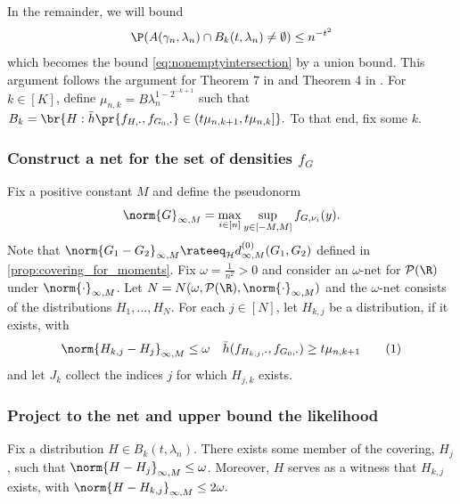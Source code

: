 \documentclass[12pt, reqno]{amsart}
\newcommand\numberthis{\addtocounter{equation}{1}\tag{\theequation}}
\newcommand{\fs}[1]{f_{#1, \boldsymbol{\cdot}}}
\newcommand{\barh}{\bar h}
\newcommand{\Hyperparams}{\mathcal{H}}
\numberwithin{equation}{section}
\begin{document}
\begin{refsection}
\begin{appendices}
In the remainder, we will bound \[
\P(A(\gamma_n, \lambda_n) \cap B_k(t, \lambda_n) \neq \emptyset) \le n^{-t^2}
\]
which becomes the bound \eqref{eq:nonemptyintersection} by a union bound. This argument
follows the argument for Theorem 7 in \citet{soloff2021multivariate} 
and Theorem 4 in \citet{jiang2020general}. For $k \in [K]$, define $\mu_{n,k} = B
\lambda_n^ {1-2^ {-k+1}}$ such that $B_k = \br{ H : \barh\pr{\fs{H}, \fs{G_0}} \in \left(t
\mu_{n,k+1}, t \mu_{n,k}\right] }.$ To that end, fix some $k$.

\subsubsection{Construct a net for the set of densities $f_G$}
Fix a positive constant $M$ and define the pseudonorm \[
\norm{G}_{\infty, M} = \max_{i\in [n]} \sup_{y \in [-M,M]} f_{G,\nu_i}(y).
\]
Note that $\norm{G_1-G_2}_{\infty, M} \rateeq_{\Hyperparams} d_{\infty, M}^{(0)}(G_1,
G_2)$
defined in
\cref{prop:covering_for_moments}. Fix $\omega = \frac{1}{n^2} > 0$ and consider an
$\omega$-net for $\mathcal P(\R)$ under $\norm{\cdot}_{\infty, M}$. Let
$N = N(\omega, \mathcal P(\R),
\norm{\cdot}_{\infty, M})$ and the $\omega$-net consists of the distributions $H_1,\ldots,
H_N$.
For each $j \in [N]$, let $H_{k,j}$ be a distribution, if it exists, with  \[
\norm{H_{k,j} - H_{j}}_{\infty, M} \le \omega \quad \bar h(\fs{H_{k,j}}, \fs{G_0}) \ge t
\mu_ {n,k+1} \numberthis \label{eq:Hkj_def}
\]
and let $J_k$ collect the indices $j$ for which $H_{j,k}$ exists.


\subsubsection{Project to the net and upper bound the likelihood}
Fix a distribution $H \in B_k(t, \lambda_n)$. There exists some member of the covering,
$H_j$, such that $ \norm{H -
H_j}_{\infty, M} \le \omega$. Moreover, $H$ serves as a witness that $H_{k,j}$
exists, with $
\norm{H - H_{k,j}}_{\infty, M} \le 2 \omega.
$


\end{appendices}
\end{refsection}
\end{document}

